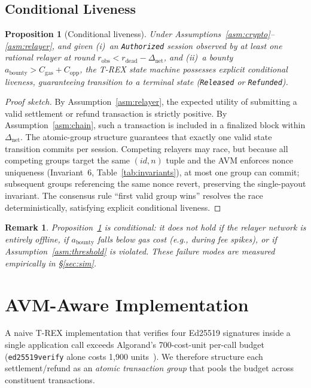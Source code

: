 \documentclass[journal]{IEEEtran}
\newtheorem{proposition}[theorem]{Proposition}
\newtheorem{remark}[theorem]{Remark}
\begin{document}
\subsection{Conditional Liveness}

\begin{proposition}[Conditional liveness]
\label{prop:liveness}
Under Assumptions~\ref{asm:crypto}--\ref{asm:relayer}, and given
(i)~an \texttt{Authorized} session observed by at least one rational
relayer at round
$r_{\text{obs}} < r_{\text{dead}} - \Delta_{\text{net}}$,
and (ii)~a bounty
$a_{\text{bounty}} > C_{\text{gas}} + C_{\text{opp}}$,
the T-REX state machine possesses explicit conditional liveness,
guaranteeing transition to a terminal state (\texttt{Released} or
\texttt{Refunded}).
\end{proposition}

\begin{proof}[Proof sketch]
By Assumption~\ref{asm:relayer}, the expected utility of submitting
a valid settlement or refund transaction is strictly positive.
By Assumption~\ref{asm:chain}, such a transaction is included in a
finalized block within $\Delta_{\text{net}}$.
The atomic-group structure guarantees that exactly one valid state
transition commits per session.
Competing relayers may race, but because all competing groups target
the same $(id, n)$ tuple and the AVM enforces nonce uniqueness
(Invariant~6, Table~\ref{tab:invariants}), at most one group can
commit; subsequent groups referencing the same nonce revert,
preserving the single-payout invariant.
The consensus rule ``first valid group wins'' resolves the race
deterministically, satisfying explicit conditional liveness.
\end{proof}

\begin{remark}
Proposition~\ref{prop:liveness} is conditional: it does not hold if
the relayer network is entirely offline, if $a_{\text{bounty}}$
falls below gas cost (e.g., during fee spikes), or if
Assumption~\ref{asm:threshold} is violated.
These failure modes are measured empirically in \S\ref{sec:sim}.
\end{remark}

\section{AVM-Aware Implementation}
\label{sec:avm}

A naive T-REX implementation that verifies four Ed25519 signatures
inside a single application call exceeds Algorand's 700-cost-unit
per-call budget (\texttt{ed25519verify} alone costs 1{,}900
units~\cite{algorand_costs}).
We therefore structure each settlement/refund as an \emph{atomic
transaction group} that pools the budget across constituent
transactions.
\end{document}
